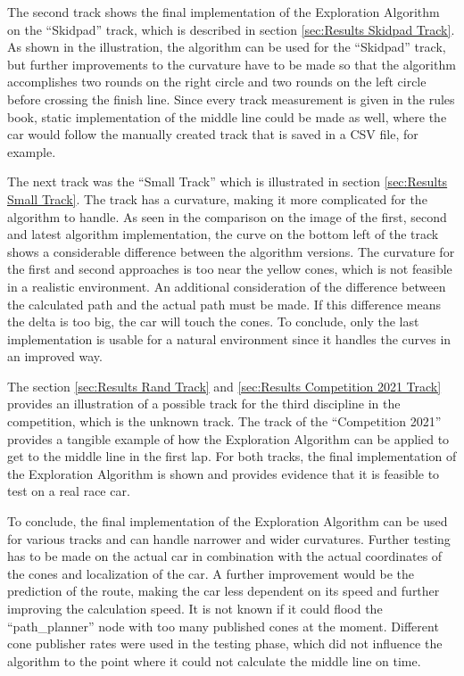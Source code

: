 The second track shows the final implementation of the Exploration Algorithm on the ``Skidpad'' track, which is described in section \ref{sec:Results Skidpad Track}. As shown in the illustration, the algorithm can be used for the ``Skidpad'' track, but further improvements to the curvature have to be made so that the algorithm accomplishes two rounds on the right circle and two rounds on the left circle before crossing the finish line. Since every track measurement is given in the rules book, static implementation of the middle line could be made as well, where the car would follow the manually created track that is saved in a CSV file, for example.

The next track was the ``Small Track'' which is illustrated in section \ref{sec:Results Small Track}. The track has a curvature, making it more complicated for the algorithm to handle. As seen in the comparison on the image of the first, second and latest algorithm implementation, the curve on the bottom left of the track shows a considerable difference between the algorithm versions. The curvature for the first and second approaches is too near the yellow cones, which is not feasible in a realistic environment. An additional consideration of the difference between the calculated path and the actual path must be made. If this difference means the delta is too big, the car will touch the cones. To conclude, only the last implementation is usable for a natural environment since it handles the curves in an improved way.

The section \ref{sec:Results Rand Track} and \ref{sec:Results Competition 2021 Track} provides an illustration of a possible track for the third discipline in the competition, which is the unknown track. The track of the ``Competition 2021'' provides a tangible example of how the Exploration Algorithm can be applied to get to the middle line in the first lap. For both tracks, the final implementation of the Exploration Algorithm is shown and provides evidence that it is feasible to test on a real race car.

To conclude, the final implementation of the Exploration Algorithm can be used for various tracks and can handle narrower and wider curvatures. Further testing has to be made on the actual car in combination with the actual coordinates of the cones and localization of the car. A further improvement would be the prediction of the route, making the car less dependent on its speed and further improving the calculation speed. It is not known if it could flood the ``path\_planner'' node with too many published cones at the moment. Different cone publisher rates were used in the testing phase, which did not influence the algorithm to the point where it could not calculate the middle line on time.

